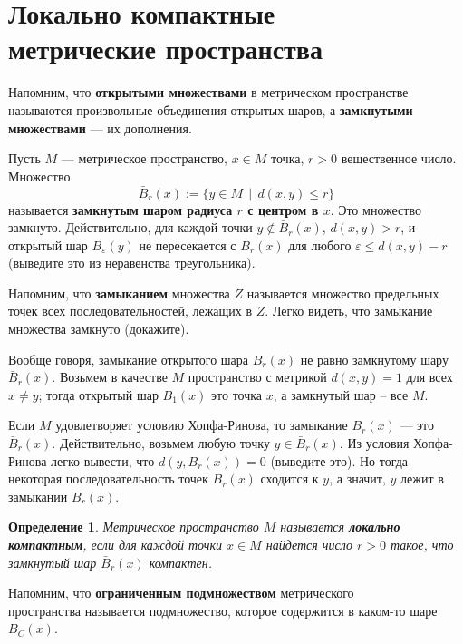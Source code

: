 \documentclass[12pt]{book}
\renewcommand{\epsilon}{\varepsilon}
\theoremstyle{upshape}
\theoremstyle{generic}
\newtheorem{opredelenie}[teorema]{Определение}
\def\еза{\end{remark}}
\theoremstyle{upshapenonumber}
\newcommand{\следствие}{%
     \refstepcounter{teorema}
     {\noindent\bf Следствие \thechapter.\arabic{teorema}:\ }}
\newcommand{\пример}{%
     \refstepcounter{teorema}
     {\noindent\bf Пример \thechapter.\arabic{teorema}:\ }}
\newcommand{\лемма}{%
     \refstepcounter{teorema}
     {\noindent\bf Лемма \thechapter.\arabic{teorema}:\ }}
\newcommand{\теорема}{%
     \refstepcounter{teorema}
     {\noindent\bf Теорема \thechapter.\arabic{teorema}:\ }}
\newcommand{\утверждение}{%
     \refstepcounter{teorema}
     {\noindent\bf Утверждение \thechapter.\arabic{teorema}:\ }}
\def\хфилл{\hfill}
\def\бф{\bf}
\def\ем{\em}
\def\ез{\end{zadacha}}
\def\еу{\end{ukazanie}}
\def\определение{\begin{opredelenie}}
\def\ео{\end{opredelenie}}
\def\енум{\begin{enumerate}}
\def\ее{\end{enumerate}}
\begin{document}

\section{Локально компактные \\метрические пространства}


Напомним, что {\бф открытыми множествами}
в метрическом пространстве называются произвольные
объединения открытых шаров, а {\бф замкнутыми множествами} --- их 
дополнения. 

Пусть $M$ --- метрическое пространство, $x\in M$ точка, $r>0$
вещественное число. Множество
\[
  \bar B_r(x):= \{ y\in M \ \ | \ \  d(x, y) \leq r\} 
\]
называется {\бф замкнутым шаром радиуса $r$ с центром в $x$}.
Это множество замкнуто. Действительно, для каждой
точки $y\notin \bar B_r(x)$, $d(x,y) > r$,
и открытый шар $B_\epsilon(y)$ не пересекается с
$\bar B_r(x)$ для любого $\epsilon \leq d(x,y) -r$
(выведите это из неравенства треугольника). 

Напомним, что {\бф замыканием} множества $Z$ называется
множество предельных точек всех последовательностей,
лежащих в $Z$. Легко видеть, что замыкание множества
замкнуто (докажите). 

Вообще говоря, замыкание открытого шара
$B_r(x)$ не равно замкнутому шару $\bar B_r(x)$. Возьмем в качестве
$M$ пространство с метрикой $d(x,y)=1$ для всех $x\neq y$;
тогда открытый шар $B_1(x)$ это точка $x$, а замкнутый шар --
все $M$.

Если $M$ удовлетворяет условию Хопфа-Ринова, то
замыкание $B_r(x)$ --- это $\bar B_r(x)$.
Действительно, возьмем любую точку 
$y\in \bar B_r(x)$.
Из условия Хопфа-Ринова легко вывести, что
$d(y, B_r(x))=0$ (выведите это). Но тогда некоторая
последовательность точек $B_r(x)$ сходится
к $y$, а значит, $y$ лежит в замыкании $B_r(x)$.

\определение
Метрическое пространство $M$ называется {\бф локально
компактным}, если для каждой точки $x\in M$ найдется
число $r>0$ такое, что замкнутый шар $\bar B_r(x)$
компактен.
\ео

\хфилл

Напомним, что {\бф ограниченным подмножеством}
метрического\\ пространства называется подмножество,
которое содержится в каком-то шаре $B_C(x)$.

\hfill
\end{document}
